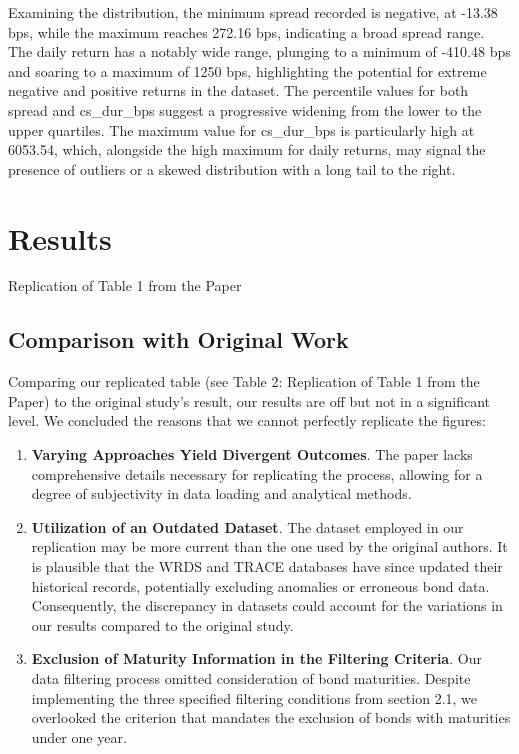 \documentclass[12pt]{article}
\begin{document}
Examining the distribution, the minimum spread recorded is negative, at -13.38 bps, while the maximum reaches 272.16 bps, indicating a broad spread range. The daily return has a notably wide range, plunging to a minimum of -410.48 bps and soaring to a maximum of 1250 bps, highlighting the potential for extreme negative and positive returns in the dataset. The percentile values for both spread and cs\_dur\_bps suggest a progressive widening from the lower to the upper quartiles. The maximum value for cs\_dur\_bps is particularly high at 6053.54, which, alongside the high maximum for daily returns, may signal the presence of outliers or a skewed distribution with a long tail to the right.



\section{Results}
\begin{table}[ht]
\centering

\caption{Replication of Table 1 from the Paper}
\label{tab:derived_table}
\end{table}

\subsection{Comparison with Original Work}
Comparing our replicated table (see Table 2: Replication of Table 1 from the Paper) to the original study's result, our results are off but not in a significant level. We concluded the reasons that we cannot perfectly replicate the figures:

\begin{enumerate}
    \item \textbf{Varying Approaches Yield Divergent Outcomes}. The paper lacks comprehensive details necessary for replicating the process, allowing for a degree of subjectivity in data loading and analytical methods.
    \item \textbf{Utilization of an Outdated Dataset}. The dataset employed in our replication may be more current than the one used by the original authors. It is plausible that the WRDS and TRACE databases have since updated their historical records, potentially excluding anomalies or erroneous bond data. Consequently, the discrepancy in datasets could account for the variations in our results compared to the original study.
    \item \textbf{Exclusion of Maturity Information in the Filtering Criteria}. Our data filtering process omitted consideration of bond maturities. Despite implementing the three specified filtering conditions from section 2.1, we overlooked the criterion that mandates the exclusion of bonds with maturities under one year.
\end{enumerate}
\end{document}
